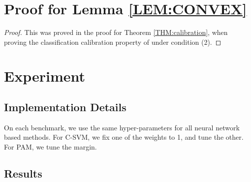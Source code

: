 \section*{Proof for Lemma \ref{LEM:CONVEX}}

\begin{proof}
This was proved in the proof for Theorem \ref{THM:calibration}, when proving the classification calibration property of  under condition (2).
\end{proof}

\section*{Experiment}

\subsection*{Implementation Details}
On each benchmark, we use the same hyper-parameters for all  neural network based methods.
For C-SVM, we fix one of the weights to 1, and tune the other. For PAM, we tune the margin.

\subsection*{Results}


